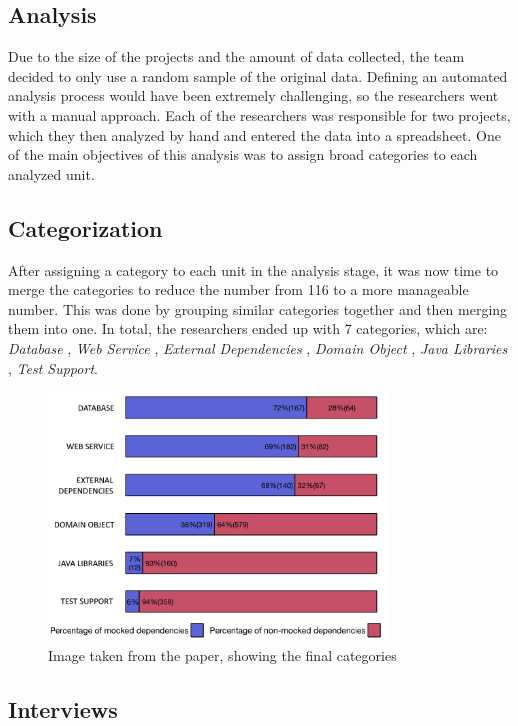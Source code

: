 \documentclass[11pt,a4paper]{article}
\begin{document}
\subsection{Analysis}

Due to the size of the projects and the amount of data collected, the team decided to only use a random sample of the original data.
Defining an automated analysis process would have been extremely challenging, so the researchers went with a manual approach.
Each of the researchers was responsible for two projects, which they then analyzed by hand and entered the data into a spreadsheet.
One of the main objectives of this analysis was to assign broad categories to each analyzed unit.

\subsection{Categorization}

After assigning a category to each unit in the analysis stage, it was now time to merge the categories to reduce the number
from 116 to a more manageable number. This was done by grouping similar categories together and then merging them into one.
In total, the researchers ended up with 7 categories, which are:
\textit{Database}
, \textit{Web Service}
, \textit{External Dependencies}
, \textit{Domain Object}
, \textit{Java Libraries}
, \textit{Test Support}.

\begin{figure}[h]
    \centering
    \includegraphics[width=0.8\textwidth]{images/categories.png}
    \caption{Image taken from the paper, showing the final categories}
\end{figure}

\subsection{Interviews}
\end{document}
